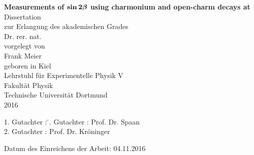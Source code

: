 
\thispagestyle{empty}
\vspace*{4.0cm}

\begin{center}
\Huge\textbf{
  Measurements of $\boldsymbol{\sin 2\beta}$ using charmonium and open-charm decays at \lhcb
}
\vfill
\Large
Dissertation \\ zur Erlangung des akademischen Grades \\ Dr. rer. nat. \\
\vspace{20pt}
\normalsize
vorgelegt von \\[5pt]
{\Large Frank Meier} \\[5pt]
geboren in Kiel \\
\vspace{20pt}
Lehrstuhl f\"ur Experimentelle Physik V \\ Fakult\"at Physik \\
Technische Universit\"at Dortmund \\ 2016

\end{center}
\newpage



\thispagestyle{empty}
\vspace*{\fill}
\begin{tabbing}
1. Gutachter : \=. Gutachter : \>Prof. Dr. Spaan \\[11pt]
2. Gutachter : \>Prof. Dr. Kröninger
\end{tabbing}
\vspace{11pt}
Datum des Einreichens der Arbeit: 04.11.2016
\newpage

